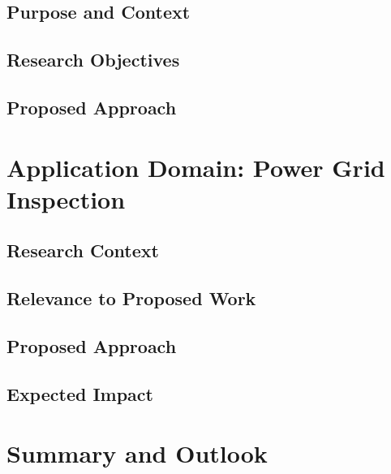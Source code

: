 \subsection{Purpose and Context}

\subsection{Research Objectives}
% 

\subsection{Proposed Approach}



\section{Application Domain: Power Grid Inspection}

\subsection{Research Context}

\subsection{Relevance to Proposed Work}

\subsection{Proposed Approach}


\subsection{Expected Impact}



\section{Summary and Outlook}
